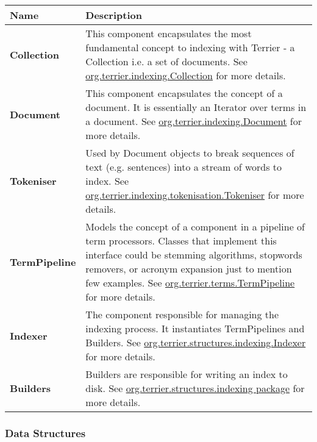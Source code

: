\begin{longtable}[]{@{}ll@{}}
\toprule
\textbf{Name} & \textbf{Description}\tabularnewline
\midrule
\endhead
\textbf{Collection} & This component encapsulates the most fundamental
concept to indexing with Terrier - a Collection i.e. a set of documents.
See
\href{javadoc/org/terrier/indexing/Collection.html}{org.terrier.indexing.Collection}
for more details.\tabularnewline
\textbf{Document} & This component encapsulates the concept of a
document. It is essentially an Iterator over terms in a document. See
\href{javadoc/org/terrier/indexing/Document.html}{org.terrier.indexing.Document}
for more details.\tabularnewline
\textbf{Tokeniser} & Used by Document objects to break sequences of text
(e.g. sentences) into a stream of words to index. See
\href{javadoc/org/terrier/indexing/tokenisation/Tokeniser.html}{org.terrier.indexing.tokenisation.Tokeniser}
for more details.\tabularnewline
\textbf{TermPipeline} & Models the concept of a component in a pipeline
of term processors. Classes that implement this interface could be
stemming algorithms, stopwords removers, or acronym expansion just to
mention few examples. See
\href{javadoc/org/terrier/terms/TermPipeline.html}{org.terrier.terms.TermPipeline}
for more details.\tabularnewline
\textbf{Indexer} & The component responsible for managing the indexing
process. It instantiates TermPipelines and Builders. See
\href{javadoc/org/terrier/structures/indexing/Indexer.html}{org.terrier.structures.indexing.Indexer}
for more details.\tabularnewline
\textbf{Builders} & Builders are responsible for writing an index to
disk. See
\href{javadoc/org/terrier/structures/indexing/package-summary.html}{org.terrier.structures.indexing
package} for more details.\tabularnewline
\bottomrule
\end{longtable}

\subsubsection{Data Structures}\label{data-structures}

